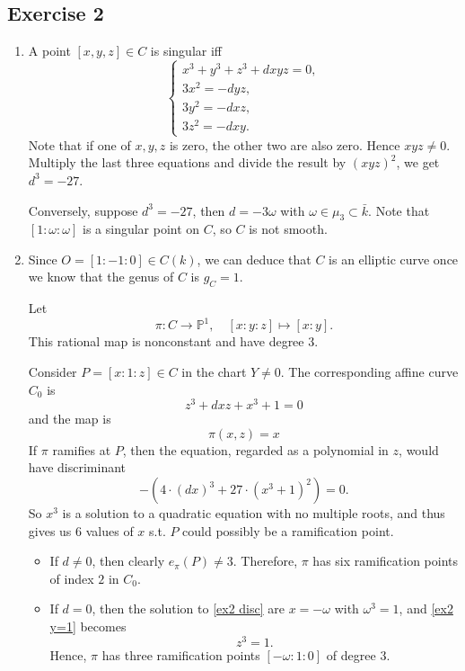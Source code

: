 \documentclass{article}
\theoremstyle{definition}
\theoremstyle{remark}
\renewcommand{\P}{\mathbb{P}}
\begin{document}
\subsection*{Exercise 2}
\begin{enumerate}
    \item A point $[x, y, z]\in C$ is singular iff \begin{equation}\label{ex2 eq1}
        \begin{cases}
            x^3 + y^3 + z^3 + dxyz = 0,\\
            3x^2 = - dyz,\\
            3y^2 =- dxz,\\
            3z^2 =- dxy.
        \end{cases}
    \end{equation}
    Note that if one of $x, y, z$ is zero, the other two are also zero. Hence $xyz \ne 0$.
    Multiply the last three equations and divide the result by $(xyz)^2$, we get $d^3 = -27$.

    Conversely, suppose $d^3 = -27$,
    then $d = -3\omega$ with $\omega\in\mu_3\subset \bar{k}$. 
    Note that $[1 : \omega : \omega]$ is a singular point on $C$, so $C$ is not smooth.

    \item Since $O = [1 : -1 : 0]\in C(k)$, we can deduce that $C$ is an elliptic curve once we know that the genus of $C$ is $g_C = 1$.

    Let \[\pi : C\to\P^1,\quad [x : y : z] \mapsto [x : y].\]
    This rational map is nonconstant and have degree $3$.

    Consider $P = [x : 1 : z]\in C$ in the chart $Y\ne 0$. The corresponding affine curve $C_0$ is \begin{equation}\label{ex2 y=1}
        z^3 + dxz + x^3 + 1 = 0
    \end{equation} and the map is \[\pi(x, z) = x\]
    If $\pi$ ramifies at $P$, then the equation, regarded as a polynomial in $z$, would have discriminant \begin{equation}\label{ex2 disc}
        -(4\cdot (dx)^3 + 27\cdot (x^3+1)^2) = 0.
    \end{equation}
    So $x^3$ is a solution to a quadratic equation with no multiple roots, and thus gives us $6$ values of $x$ s.t. $P$ could possibly be a ramification point.
    \begin{itemize}
        \item {\color{red}If $d \ne 0$}, then clearly $e_\pi(P) \ne 3$.   
        Therefore, $\pi$ has six ramification points of index $2$ in $C_0$.
        \item {\color{red} If $d = 0$, then the solution to \cref{ex2 disc} are $x = -\omega$ with $\omega^3 = 1$, and \cref{ex2 y=1} becomes \[z^3 = 1.\]
        Hence, $\pi$ has three ramification points $[-\omega : 1 : 0]$ of degree $3$.}
    \end{itemize}


\end{enumerate}
\end{document}
